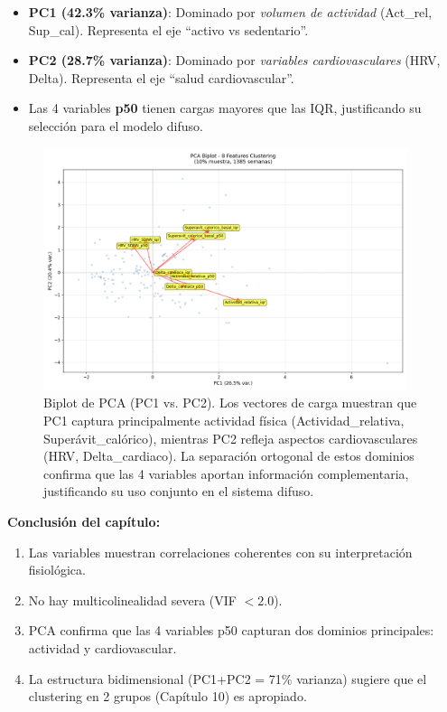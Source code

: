 \documentclass[12pt,letterpaper,twoside]{report}
\begin{document}
\begin{calculobox}
\begin{decisionbox}
\begin{itemize}[noitemsep]
    \item \textbf{PC1 (42.3\% varianza)}: Dominado por \textit{volumen de actividad} (Act\_rel, Sup\_cal). Representa el eje ``activo vs sedentario''.
    \item \textbf{PC2 (28.7\% varianza)}: Dominado por \textit{variables cardiovasculares} (HRV, Delta). Representa el eje ``salud cardiovascular''.
    \item Las 4 variables \textbf{p50} tienen cargas mayores que las IQR, justificando su selección para el modelo difuso.
\end{itemize}
\end{decisionbox}

\begin{figure}[htbp]
\centering
\includegraphics[width=0.95\textwidth]{../analisis_u/semanal/precluster/pca_biplot.png}
\caption{Biplot de PCA (PC1 vs. PC2). Los vectores de carga muestran que PC1 captura principalmente actividad física (Actividad\_relativa, Superávit\_calórico), mientras PC2 refleja aspectos cardiovasculares (HRV, Delta\_cardiaco). La separación ortogonal de estos dominios confirma que las 4 variables aportan información complementaria, justificando su uso conjunto en el sistema difuso.}
\label{fig:pca_biplot}
\end{figure}

\begin{conclusionbox}
\textbf{Conclusión del capítulo:}

\begin{enumerate}[noitemsep]
    \item Las variables muestran correlaciones coherentes con su interpretación fisiológica.
    \item No hay multicolinealidad severa (VIF $< 2.0$).
    \item PCA confirma que las 4 variables p50 capturan dos dominios principales: actividad y cardiovascular.
    \item La estructura bidimensional (PC1+PC2 = 71\% varianza) sugiere que el clustering en 2 grupos (Capítulo 10) es apropiado.
\end{enumerate}
\end{conclusionbox}


\end{calculobox}
\end{document}
